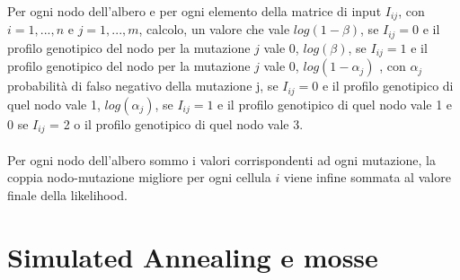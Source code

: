 \documentclass[12pt]{report}
\begin{document}
  Per ogni nodo dell'albero e per ogni elemento della matrice di input $I_{ij}$, con $i = 1, ..., n$ e $j = 1, ..., m$, calcolo, un valore che vale $log(1 - \beta)$, se $I_{ij} = 0$ e il profilo genotipico del nodo per la mutazione $j$ vale 0, $log(\beta)$, se $I_{ij} = 1$ e il profilo genotipico del nodo per la mutazione $j$ vale 0, $log(1 - \alpha_{j})$ , con $\alpha_{j}$ probabilità di falso negativo della mutazione j, se $I_{ij} = 0$ e il profilo genotipico di quel nodo vale 1, $log(\alpha_{j})$, se $I_{ij} = 1$ e il profilo genotipico di quel nodo vale 1 e 0 se $I_{ij}$ = 2 o il profilo genotipico di quel nodo vale 3.\\\\
  Per ogni nodo dell'albero sommo i valori corrispondenti ad ogni mutazione, la coppia nodo-mutazione migliore per ogni cellula $i$ viene infine sommata al valore finale della likelihood.

  \section{Simulated Annealing e mosse}
\end{document}
